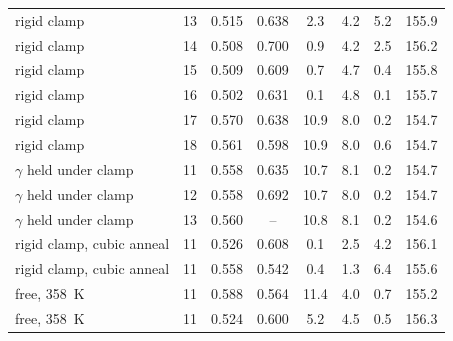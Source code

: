 \begin{table}[htbp]
\begin{tabular}{llcccccc}
rigid clamp & 13 & 0.515 & 0.638 & 2.3 & 4.2 & 5.2 & 155.9 \\
rigid clamp & 14 & 0.508 & 0.700 & 0.9 & 4.2 & 2.5 & 156.2 \\
rigid clamp & 15 & 0.509 & 0.609 & 0.7 & 4.7 & 0.4 & 155.8 \\
rigid clamp & 16 & 0.502 & 0.631 & 0.1 & 4.8 & 0.1 & 155.7 \\
rigid clamp & 17 & 0.570 & 0.638 & 10.9 & 8.0 & 0.2 & 154.7 \\
rigid clamp & 18 & 0.561 & 0.598 & 10.9 & 8.0 & 0.6 & 154.7 \\
$\gamma$ held under clamp & 11 & 0.558 & 0.635 & 10.7 & 8.1 & 0.2 & 154.7 \\
$\gamma$ held under clamp & 12 & 0.558 & 0.692 & 10.7 & 8.0 & 0.2 & 154.7 \\
$\gamma$ held under clamp & 13 & 0.560 & -- & 10.8 & 8.1 & 0.2 & 154.6 \\
rigid clamp, cubic anneal & 11 & 0.526 & 0.608 & 0.1 & 2.5 & 4.2 & 156.1 \\
rigid clamp, cubic anneal & 11 & 0.558 & 0.542 & 0.4 & 1.3 & 6.4 & 155.6 \\
free, \SI{358}{K} & 11 & 0.588 & 0.564 & 11.4 & 4.0 & 0.7 & 155.2 \\
free, \SI{358}{K} & 11 & 0.524 & 0.600 & 5.2 & 4.5 & 0.5 & 156.3 \\
\bottomrule
\end{tabular}
\end{table}
